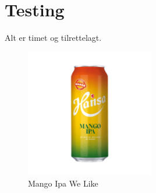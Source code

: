 \chapter{Testing}
\thispagestyle{fancy}
Alt er timet og tilrettelagt.


\begin{figure}[htbp]
    \centering
    \includegraphics[width=0.5\textwidth]{Bilder/mango.jpg}
    \caption{Mango Ipa We Like}\label{fig:Mango-Logo}
\end{figure}
    